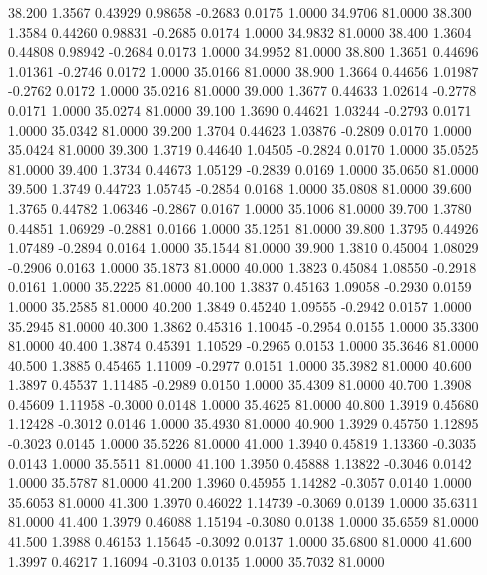   38.200   1.3567   0.43929   0.98658  -0.2683   0.0175   1.0000  34.9706  81.0000
  38.300   1.3584   0.44260   0.98831  -0.2685   0.0174   1.0000  34.9832  81.0000
  38.400   1.3604   0.44808   0.98942  -0.2684   0.0173   1.0000  34.9952  81.0000
  38.800   1.3651   0.44696   1.01361  -0.2746   0.0172   1.0000  35.0166  81.0000
  38.900   1.3664   0.44656   1.01987  -0.2762   0.0172   1.0000  35.0216  81.0000
  39.000   1.3677   0.44633   1.02614  -0.2778   0.0171   1.0000  35.0274  81.0000
  39.100   1.3690   0.44621   1.03244  -0.2793   0.0171   1.0000  35.0342  81.0000
  39.200   1.3704   0.44623   1.03876  -0.2809   0.0170   1.0000  35.0424  81.0000
  39.300   1.3719   0.44640   1.04505  -0.2824   0.0170   1.0000  35.0525  81.0000
  39.400   1.3734   0.44673   1.05129  -0.2839   0.0169   1.0000  35.0650  81.0000
  39.500   1.3749   0.44723   1.05745  -0.2854   0.0168   1.0000  35.0808  81.0000
  39.600   1.3765   0.44782   1.06346  -0.2867   0.0167   1.0000  35.1006  81.0000
  39.700   1.3780   0.44851   1.06929  -0.2881   0.0166   1.0000  35.1251  81.0000
  39.800   1.3795   0.44926   1.07489  -0.2894   0.0164   1.0000  35.1544  81.0000
  39.900   1.3810   0.45004   1.08029  -0.2906   0.0163   1.0000  35.1873  81.0000
  40.000   1.3823   0.45084   1.08550  -0.2918   0.0161   1.0000  35.2225  81.0000
  40.100   1.3837   0.45163   1.09058  -0.2930   0.0159   1.0000  35.2585  81.0000
  40.200   1.3849   0.45240   1.09555  -0.2942   0.0157   1.0000  35.2945  81.0000
  40.300   1.3862   0.45316   1.10045  -0.2954   0.0155   1.0000  35.3300  81.0000
  40.400   1.3874   0.45391   1.10529  -0.2965   0.0153   1.0000  35.3646  81.0000
  40.500   1.3885   0.45465   1.11009  -0.2977   0.0151   1.0000  35.3982  81.0000
  40.600   1.3897   0.45537   1.11485  -0.2989   0.0150   1.0000  35.4309  81.0000
  40.700   1.3908   0.45609   1.11958  -0.3000   0.0148   1.0000  35.4625  81.0000
  40.800   1.3919   0.45680   1.12428  -0.3012   0.0146   1.0000  35.4930  81.0000
  40.900   1.3929   0.45750   1.12895  -0.3023   0.0145   1.0000  35.5226  81.0000
  41.000   1.3940   0.45819   1.13360  -0.3035   0.0143   1.0000  35.5511  81.0000
  41.100   1.3950   0.45888   1.13822  -0.3046   0.0142   1.0000  35.5787  81.0000
  41.200   1.3960   0.45955   1.14282  -0.3057   0.0140   1.0000  35.6053  81.0000
  41.300   1.3970   0.46022   1.14739  -0.3069   0.0139   1.0000  35.6311  81.0000
  41.400   1.3979   0.46088   1.15194  -0.3080   0.0138   1.0000  35.6559  81.0000
  41.500   1.3988   0.46153   1.15645  -0.3092   0.0137   1.0000  35.6800  81.0000
  41.600   1.3997   0.46217   1.16094  -0.3103   0.0135   1.0000  35.7032  81.0000
